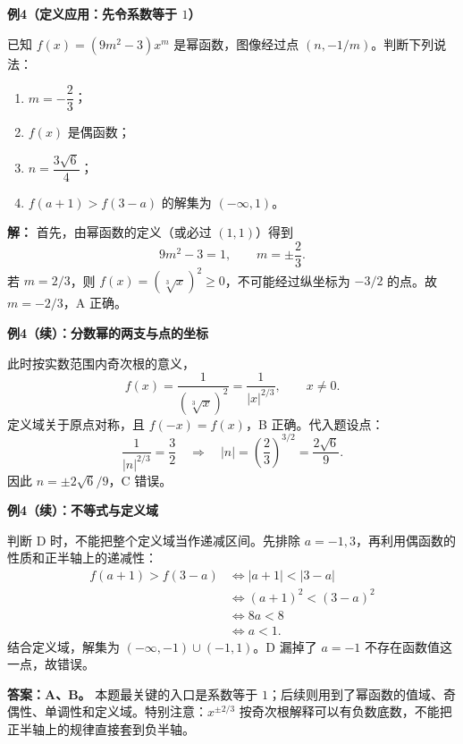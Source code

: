 \begin{examplebox}
\textbf{\textcolor{CExample}{例4（定义应用：先令系数等于 $1$）}}



  已知 $f(x)=(9m^2-3)x^m$ 是幂函数，图像经过点 $(n,-1/m)$。判断下列说法：
  \begin{enumerate}[label=\Alph*.,leftmargin=*,itemsep=0.25em]
    \item $m=-\dfrac23$；
    \item $f(x)$ 是偶函数；
    \item $n=\dfrac{3\sqrt6}{4}$；
    \item $f(a+1)>f(3-a)$ 的解集为 $(-\infty,1)$。
  \end{enumerate}

  \textbf{解：} 首先，由幂函数的定义（或必过 $(1,1)$）得到
  \[
     9m^2-3=1,\qquad m=\pm\frac23.
  \]
  若 $m=2/3$，则 $f(x)=(\sqrt[3]{x})^2\ge0$，不可能经过纵坐标为 $-3/2$ 的点。故 $m=-2/3$，A 正确。

\end{examplebox}\clearpage\begin{examplebox}\textbf{\textcolor{CExample}{例4（续）：分数幂的两支与点的坐标}}

  此时按实数范围内奇次根的意义，
  \[
    f(x)=\frac1{(\sqrt[3]{x})^2}
        =\frac1{|x|^{2/3}},\qquad x\ne0.
  \]
  定义域关于原点对称，且 $f(-x)=f(x)$，B 正确。代入题设点：
  \[
  \frac1{|n|^{2/3}}=\frac32
  \quad\Longrightarrow\quad
  |n|=\left(\frac23\right)^{3/2}
     =\frac{2\sqrt6}{9}.
  \]
  因此 $n=\pm 2\sqrt6/9$，C 错误。

\end{examplebox}\clearpage\begin{examplebox}\textbf{\textcolor{CExample}{例4（续）：不等式与定义域}}

  判断 D 时，不能把整个定义域当作递减区间。先排除 $a=-1,3$，再利用偶函数的性质和正半轴上的递减性：
  \[
  \begin{aligned}
  f(a+1)>f(3-a)
  &\iff |a+1|<|3-a|\\
  &\iff (a+1)^2<(3-a)^2\\
  &\iff 8a<8\\
  &\iff a<1.
  \end{aligned}
  \]
  结合定义域，解集为 $(-\infty,-1)\cup(-1,1)$。D 漏掉了 $a=-1$ 不存在函数值这一点，故错误。

  \textbf{答案：A、B。} 本题最关键的入口是系数等于 $1$；后续则用到了幂函数的值域、奇偶性、单调性和定义域。特别注意：$x^{\pm2/3}$ 按奇次根解释可以有负数底数，不能把正半轴上的规律直接套到负半轴。

  \medskip
  
\end{examplebox}
